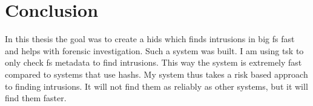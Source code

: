 
\chapter{Conclusion}
\label{sec:Conclusion}

In this thesis the goal was to create a \gls{hids} which finds intrusions in big \gls{fs} fast and helps with forensic investigation. Such a system was built. I am using \gls{tsk} to only check \gls{fs} \gls{metadata} to find intrusions. This way the system is extremely fast compared to systems that use \glspl{hash}. My system thus takes a risk based approach to finding intrusions. It will not find them as reliably as other systems, but it will find them faster. 
